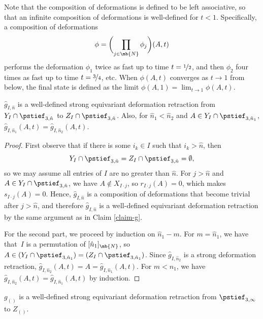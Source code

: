 Note that the composition of deformations is defined to be left associative, so that an infinite composition of deformations is well-defined for $t<1$. Specifically, a composition of deformations
\[\phi = \biggl(\prod_{j \in \mb{N}} \phi_j\biggr) (A,t) \]
performs the deformation $\phi_1$ twice as fast up to time $t = \nicefrac{1}{2}$, and then $\phi_2$ four times as fast up to time $t = \nicefrac{3}{4}$, etc.
When $\phi(A,t)$ converges as $t \to 1$ from below, the final state is defined as the limit $\phi(A,1) = \lim_{t \to 1} \phi(A,t)$.

\begin{claim}\label{claim-consistent-g}
$\hat g_{I,\hat n}$ is a well-defined strong equivariant deformation retraction from $Y_I \cap \pstief_{3,\hat n}$ to $Z_I \cap \pstief_{3,\hat n}$.
Also, for $\hat n_1 < \hat n_2$ and $A \in Y_I \cap \pstief_{3,\hat n_1}$, $\hat g_{I,\hat n_1}(A,t) = \hat g_{I,\hat n_2}(A,t)$.
\end{claim}

\begin{proof}
First observe that if there is some $i_k \in I$ such that $i_k > \hat n$, then
\[
Y_I \cap \pstief_{3,\hat n} = Z_I \cap \pstief_{3,\hat n} = \emptyset,
\]
so we may assume all entries of $I$ are no greater than $\hat n$.
For $j > \hat n$ and \hbox{$A \in Y_I \cap \pstief_{3,\hat n}$}, we have $A \not \in X_{I\cdot j}$, so $r_{I\cdot j}(A) = 0$, which makes $s_{I\cdot j}(A) = 0$. Hence, $\hat g_{I,\hat n}$ is a composition of deformations that become trivial after $j > \hat n$, and therefore $\hat g_{I,\hat n}$ is a well-defined equivariant deformation retraction by the same argument as in Claim \ref{claim-g}.

For the second part, we proceed by induction on $\hat n_1 -m$.
For $m = \hat n_1$, we have that~$I$ is a permutation of $[\hat n_1]_\mb{N}$, so $A \in (Y_I \cap \pstief_{3,\hat n_1}) = (Z_I \cap \pstief_{3,\hat n_1})$. Since $\hat g_{I,\hat n_2}$ is a strong deformation retraction, $\hat g_{I,\hat n_2}(A,t) = A = \hat g_{I,\hat n_1}(A,t)$. For $m < n_1$, we have $\hat g_{I,\hat n_2}(A,t) = \hat g_{I,\hat n_1}(A,t)$ by induction.
\end{proof}

\begin{claim}\label{claim-infinite-g}
$g_{()}$ is a well-defined strong equivariant deformation retraction from $\pstief_{3,\infty}$ to $Z_{()}$.
\end{claim}

